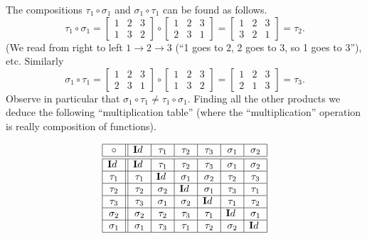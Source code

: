 \begin{exa}
The compositions $\tau_1 \circ \sigma_1$ and $\sigma_1\circ
\tau_1$ can be found as follows.
$$ \tau_1 \circ \sigma_1  = \begin{bmatrix} 1 & 2 & 3 \\  1 & 3 & 2 \end{bmatrix}\circ
\begin{bmatrix} 1 & 2 & 3 \\ 2 & 3 & 1
\end{bmatrix} = \begin{bmatrix}1 & 2 & 3 \\ 3 & 2 & 1 \end{bmatrix} = \tau_2 .$$
(We read from right to left $1 \rightarrow 2 \rightarrow 3$ (``1
goes to 2, 2 goes to 3, so 1 goes to 3''), etc. Similarly
$$ \sigma_1 \circ \tau_1  = \begin{bmatrix} 1 & 2 & 3 \\ 2 & 3 & 1
\end{bmatrix}\circ\begin{bmatrix}1 & 2 & 3 \\  1 & 3 & 2 \end{bmatrix}
 = \begin{bmatrix} 1 & 2 & 3 \\ 2 & 1 & 3 \end{bmatrix} =
 \tau_3.$$Observe in particular that $\sigma_1 \circ \tau_1  \neq \tau_1 \circ \sigma_1 .$
 Finding all the other products we deduce the following
 ``multiplication table'' (where the ``multiplication'' operation
 is really composition of functions).

$$\begin{array}{|c||c|c|c|c|c|c|}
\hline \circ & {\mathbf Id\ } & \tau_1 & \tau_2 & \tau_3  & \sigma_1 & \sigma_2\\
\hline \hline  {\mathbf Id\ } & {\mathbf Id\ } & \tau_1  & \tau_2  & \tau_3 & \sigma_1 & \sigma_2   \\
\hline  \tau_1 & \tau_1 &   {\mathbf Id\ } & \sigma_1 &\sigma_2  & \tau_2 & \tau_3   \\
\hline \tau_2 & \tau_2 & \sigma_2  & {\mathbf Id\ } & \sigma_1 & \tau_3&\tau_1 \\
\hline \tau_3 & \tau_3 & \sigma_1& \sigma_2 & {\mathbf Id\ } &\tau_1 & \tau_2 \\
\hline \sigma_2 & \sigma_2 & \tau_2& \tau_3& \tau_1& {\mathbf Id\ } & \sigma_1 \\
\hline \sigma_1 & \sigma_1 &  \tau_3 & \tau_1 & \tau_2& \sigma_2 &{\mathbf Id\ } \\
\hline
\end{array}$$
\label{ex:tau}\end{exa}

